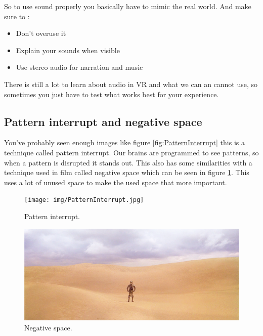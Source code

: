 \documentclass{report}
\begin{document}
				So to use sound properly you basically have to mimic the real world. 
				And make sure to :
				\begin{itemize}
					\item Don't overuse it
					\item Explain your sounds when visible
					\item Use stereo audio for narration and music
				\end{itemize}
				There is still a lot to learn about audio in VR and what we can an cannot use, so sometimes you just have to test what works best for your experience. 
				
				
				\subsection{Pattern interrupt and negative space}
				You've probably seen enough images like figure \ref{fig:PatternInterrupt} this is a technique called pattern interrupt. Our brains are programmed to see patterns, so when a pattern is disrupted it stands out. This also has some similarities with a technique used in film called negative space which can be seen in figure \ref{fig:NegativeSpace}. This uses a lot of unused space to make the used space that more important. 
							
				
				\begin{figure}[!h]
					\centering
					\begin{minipage}[b!]{0.35\textwidth}
						\texttt{[image: img/PatternInterrupt.jpg]}
						\caption{Pattern interrupt.}
						\label{fig:PatternInterrupt}
					\end{minipage}
					\hfill
					\begin{minipage}[b!]{0.4\textwidth}
						\includegraphics[width=\textwidth]{img/C3PONegativeSpace.png}
						\caption{Negative space.}
						\label{fig:NegativeSpace}
					\end{minipage}
				\end{figure}
				
\end{document}
